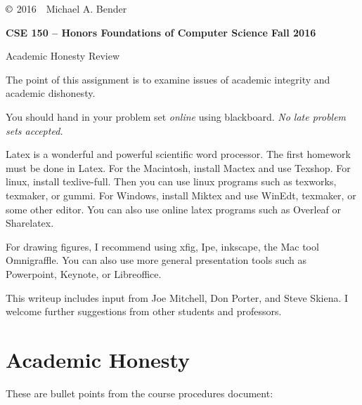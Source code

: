 \documentclass[11pt]{article}
\begin{document}
\begin{flushleft}
   $\copyright$  2016~~Michael A. Bender
\end{flushleft}
\centerline{\bf CSE 150 -- 
Honors Foundations of Computer Science  Fall 2016}
\medskip
\centerline{Academic Honesty Review}
\bigskip
\bigskip

The point of this assignment is to examine issues of academic
integrity and academic dishonesty.

You should hand in your problem set \emph{online} using
blackboard. \emph{No late problem sets accepted.}

Latex is a wonderful and powerful scientific word processor. The first
homework must be done in Latex. \newline For the Macintosh, install
Mactex and use Texshop.  For linux, install texlive-full. Then you can
use linux programs such as texworks, texmaker, or gummi.  For Windows,
install Miktex and use WinEdt, texmaker, or some other editor. You can
also use online latex programs such as Overleaf or Sharelatex.

For drawing figures, I recommend using xfig, Ipe, inkscape, the Mac
tool Omnigraffle. You can also use more general presentation tools
such as Powerpoint, Keynote, or Libreoffice.

This writeup includes input from Joe Mitchell, Don Porter, and Steve
Skiena.  I welcome further suggestions from other students and
professors.


\section*{Academic Honesty}

These are bullet points from the course procedures document:
\end{document}
